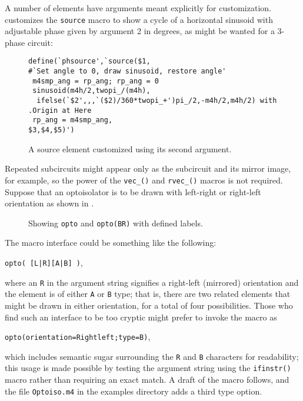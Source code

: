A number of elements have arguments meant explicitly for customization.
 customizes the {\tt source} macro to show a cycle of a horizontal sinusoid with adjustable phase given by argument 2 in degrees,
as might be wanted for a 3-phase circuit:
\begin{figure}[ht]
\hfill
 \vspace*{-0.5in}
\begin{verbatim}
define(`phsource',`source($1,
#`Set angle to 0, draw sinusoid, restore angle'
 m4smp_ang = rp_ang; rp_ang = 0
 sinusoid(m4h/2,twopi_/(m4h),
  ifelse(`$2',,,`($2)/360*twopi_+')pi_/2,-m4h/2,m4h/2) with .Origin at Here
 rp_ang = m4smp_ang,
$3,$4,$5)')
\end{verbatim}
\vspace*{-\baselineskip}
   \caption{A source element customized using its second argument.}
   \label{Sinus}
   \end{figure}

Repeated subcircuits might appear only
as the subcircuit and its mirror image, for example, so the
power of the \verb|vec_()| and \verb|rvec_()| macros is not required.
Suppose that an optoisolator is to be drawn with left-right or right-left
orientation as shown in .
\begin{figure}[h!b]
   
   \caption{Showing {\tt opto} and {\tt opto(BR)} with defined labels.}
   \label{Opto}
   \end{figure}

The macro interface could be something like the following:
\par
{\tt opto( [L|R][A|B] )},

\noindent where an {\tt R} in the argument string signifies a right-left
(mirrored) orientation and the element is of either {\tt A} or {\tt B} type;
that is, there are two related elements that might be drawn in either
orientation, for a total of four possibilities.
Those who find such an interface to be too cryptic might prefer to
invoke the macro as
\par
{\tt opto(orientation=Rightleft;type=B)},

\noindent
which includes semantic sugar surrounding the {\tt R} and {\tt B} characters
for readability; this usage is made possible by testing the argument string
using the {\tt ifinstr()} macro rather than requiring an exact match.
A draft of the macro follows, and the file {\tt Optoiso.m4} in the examples
directory adds a third type option.


